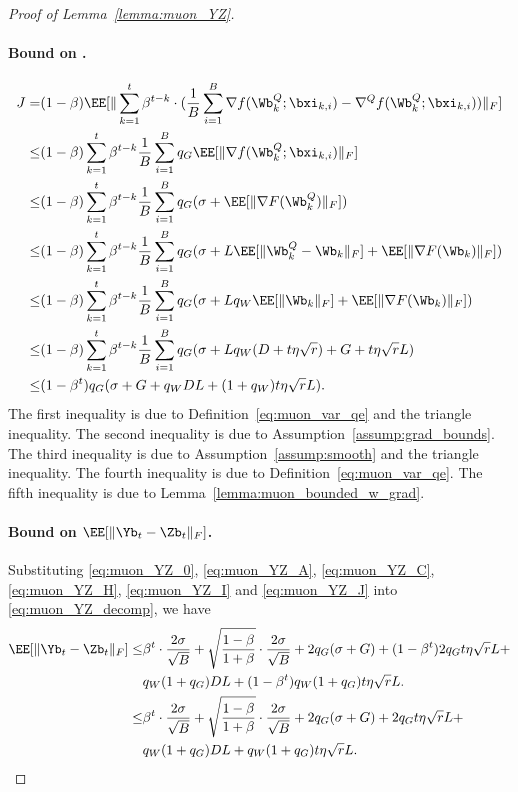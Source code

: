 \documentclass[11pt, letterpaper]{article}
\begin{document}
\begin{proof}[Proof of Lemma~\ref{lemma:muon_YZ}]
\paragraph{Bound on .}
\begin{align}\label{eq:muon_YZ_J}
    J
    =& (1-\beta) \EE[\|\sum_{k=1}^t\beta^{t-k}\cdot(\frac{1}{B}\sum_{i=1}^B\nabla f(\Wb_k^Q;\bxi_{k,i}) - \nabla^Q f(\Wb_k^Q;\bxi_{k,i}) ) \|_F] \notag \\
    \le& (1-\beta) \sum_{k=1}^t\beta^{t-k}\frac{1}{B}\sum_{i=1}^B q_G\EE[\| \nabla f(\Wb_k^Q;\bxi_{k,i}) \|_F] \notag \\
    \le& (1-\beta) \sum_{k=1}^t\beta^{t-k}\frac{1}{B}\sum_{i=1}^B q_G(\sigma + \EE[\| \nabla F(\Wb_k^Q) \|_F]) \notag \\
    \le& (1-\beta) \sum_{k=1}^t\beta^{t-k}\frac{1}{B}\sum_{i=1}^B q_G(\sigma + L\EE[\| \Wb_k^Q -\Wb_k \|_F] + \EE[\| \nabla F(\Wb_k) \|_F]) \notag \\
    \le& (1-\beta) \sum_{k=1}^t\beta^{t-k}\frac{1}{B}\sum_{i=1}^B q_G(\sigma + Lq_W\EE[\| \Wb_k \|_F] + \EE[\| \nabla F(\Wb_k) \|_F]) \notag \\
    \le& (1-\beta) \sum_{k=1}^t\beta^{t-k}\frac{1}{B}\sum_{i=1}^B q_G(\sigma + Lq_W( D + t\eta\sqrt{r}) + G + t \eta\sqrt{r}L) \notag \\
    \le& (1-\beta^t)q_G(\sigma + G + q_W D L + (1+q_W)t\eta\sqrt{r}L).
\end{align}
The first inequality is due to Definition~\ref{eq:muon_var_qe} and the triangle inequality. The second inequality is due to Assumption~\ref{assump:grad_bounds}. The third inequality is due to Assumption~\ref{assump:smooth} and the triangle inequality. The fourth inequality is due to Definition~\ref{eq:muon_var_qe}. The fifth inequality is due to Lemma~\ref{lemma:muon_bounded_w_grad}.


\paragraph{Bound on $\EE[\| \Yb_t - \Zb_t \|_F]$.}
Substituting \eqref{eq:muon_YZ_0}, \eqref{eq:muon_YZ_A}, \eqref{eq:muon_YZ_C}, \eqref{eq:muon_YZ_H}, \eqref{eq:muon_YZ_I} and \eqref{eq:muon_YZ_J} into \eqref{eq:muon_YZ_decomp}, we have
\begin{align*}
    \EE[\| \Yb_t - \Zb_t \|_F] \le& \beta^t\cdot\frac{2\sigma}{\sqrt{B}} + \sqrt{\frac{1-\beta}{1+\beta}}\cdot\frac{2\sigma}{\sqrt{B}} + 2q_G(\sigma + G) + (1-\beta^t)2q_G t\eta\sqrt{r}L + \\
    & q_W(1+q_G)DL + (1-\beta^t)q_W(1+q_G)t\eta\sqrt{r}L. \\
    \le& \beta^t\cdot\frac{2\sigma}{\sqrt{B}} + \sqrt{\frac{1-\beta}{1+\beta}}\cdot\frac{2\sigma}{\sqrt{B}} + 2q_G(\sigma + G) + 2q_G t\eta\sqrt{r}L + \\
        & q_W(1+q_G)DL + q_W(1+q_G)t\eta\sqrt{r}L.
\end{align*}



\end{proof}
\end{document}
